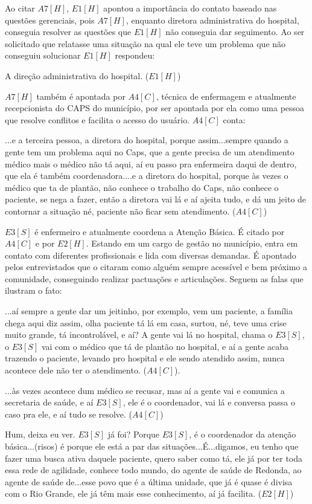 Ao citar $A7[H]$, $E1[H]$ apontou a importância do contato baseado nas questões gerenciais, pois $A7[H]$, enquanto diretora administrativa do hospital, conseguia resolver as questões que $E1[H]$ não conseguia dar seguimento. Ao ser solicitado que relatasse uma situação na qual ele teve um problema que não conseguiu solucionar $E1[H]$ respondeu: 

\begin{citacao}
A direção administrativa do hospital. ($E1[H]$)
\end{citacao}

$A7[H]$ também é apontada por $A4[C]$, técnica de enfermagem e atualmente recepcionista do CAPS do município, por ser apontada por ela como uma pessoa que resolve conflitos e facilita o acesso do usuário. $A4[C]$ conta: 

\begin{citacao}
...e a terceira pessoa, a diretora do hospital, porque assim...sempre quando a gente tem um problema aqui no Caps, que a gente precisa de um atendimento médico mais o médico não tá aqui, aí eu passo pra enfermeira daqui de dentro, que ela é também coordenadora....e a diretora do hospital, porque às vezes o médico que ta de plantão, não conhece o trabalho do Caps, não conhece o paciente, se nega a fazer, então a diretora vai lá e aí ajeita tudo, e dá um jeito de contornar a situação né, paciente não ficar sem atendimento. ($A4[C]$)
\end{citacao}


$E3[S]$ é enfermeiro e atualmente coordena a Atenção Básica. É citado por $A4[C]$ e por $E2[H]$. Estando em um cargo de gestão no município, entra em contato com diferentes profissionais e lida com diversas demandas. É apontado pelos entrevistados que o citaram como alguém sempre acessível e bem próximo a comunidade, conseguindo realizar pactuações e articulações. Seguem as falas que ilustram o fato:

\begin{citacao}
 ...aí sempre a gente dar um jeitinho, por exemplo, vem um paciente, a família chega aqui diz assim, olha paciente tá lá em casa, surtou, né, teve uma crise muito grande, tá incontrolável, e aí? A gente vai lá no hospital, chama o $E3[S]$, o $E3[S]$ vai com o médico que tá de plantão no hospital, e aí a gente acaba trazendo o paciente, levando pro hospital e ele sendo atendido assim, nunca acontece dele não ter o atendimento. ($A4[C]$).
 
...às vezes acontece dum médico se recusar, mas aí a gente vai e comunica a secretaria de saúde, e aí $E3[S]$, ele é o coordenador, vai lá e conversa passa o caso pra ele, e aí tudo se resolve. ($A4[C]$)

Hum, deixa eu ver. $E3[S]$ já foi? Porque $E3[S]$, é o coordenador da atenção básica...(risos) é porque ele está a par das situações...É...digamos, eu tenho que fazer uma busca ativa daquele paciente, quero saber como tá, ele já por ter toda essa rede de agilidade, conhece todo mundo, do agente de saúde de Redonda, ao agente de saúde de...esse povo que é a última unidade, que já é quase é  divisa com o Rio Grande, ele já têm mais esse conhecimento, aí já facilita. ($E2[H]$)
\end{citacao}

